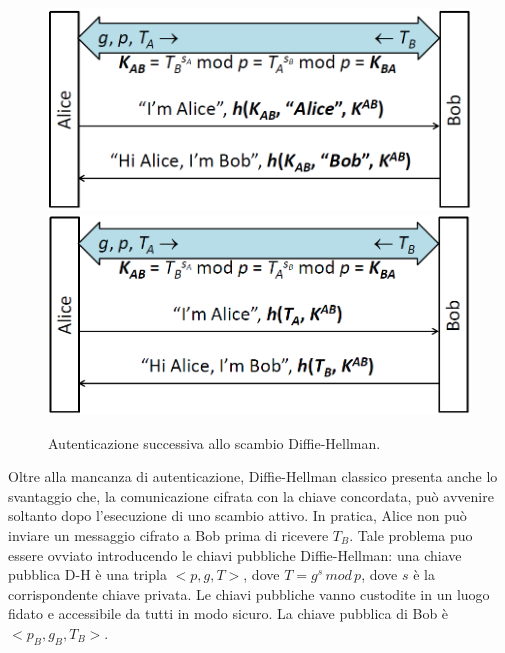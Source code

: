 \begin{figure}[htbp]
	\centering
	\subfigure
	{\includegraphics[scale=0.5, keepaspectratio]{Immagini/chiave_pubblica/DiffieHellman_auth4.png}}
	\hspace{2mm}
	\subfigure
	{\includegraphics[scale=0.5, keepaspectratio]{Immagini/chiave_pubblica/DiffieHellman_auth5.png}}
	\caption{Autenticazione successiva allo scambio Diffie-Hellman.}
	\label{fig:auth45}
	\end{figure}

Oltre alla mancanza di autenticazione, Diffie-Hellman classico presenta anche lo svantaggio che, la comunicazione cifrata con la chiave concordata, può avvenire soltanto dopo l'esecuzione di uno scambio attivo. In pratica, Alice non può inviare un messaggio cifrato a Bob prima di ricevere $T_{B}$. Tale problema puo essere ovviato
introducendo le chiavi pubbliche Diffie-Hellman: una chiave pubblica D-H è una tripla $<p, g, T>$, dove $T = g^s \, mod \, p$, dove $s$ è la corrispondente chiave privata. Le chiavi pubbliche vanno custodite in un luogo fidato e accessibile da tutti in modo sicuro. La chiave pubblica di Bob è $<p_{B}, g_{B}, T_{B}>$. \\

